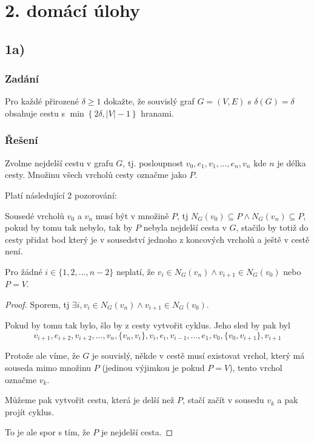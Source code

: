 \documentclass[../main.tex]{subfiles}
\begin{document}
\section{2. domácí úlohy}

\subsection{1a)}
\subsubsection*{Zadání}
Pro každé přirozené $\delta\geq1$ dokažte, že souvislý graf
$G=(V,E)$ s $\delta(G) = \delta$ obsahuje cestu s $\min\left\{2\delta, |V| - 1\right\}$
hranami.

\subsubsection*{Řešení}

Zvolme nejdelší cestu v grafu $G$, tj. posloupnost $v_0, e_1, v_1, ..., e_n, v_n$
kde $n$ je délka cesty. Množinu všech vrcholů cesty označme jako $P$.

Platí následující 2 pozorování:

Sousedé vrcholů $v_0$ a $v_n$ musí být v množině $P$, tj $N_G(v_0) \subseteq P \wedge N_G(v_n) \subseteq P$,
pokud by tomu tak nebylo, tak by $P$ nebyla nejdelší cesta v $G$, 
stačilo by totiž do cesty přidat bod který je v sousedství jednoho z koncových vrcholů a ještě v cestě není.

Pro žádné $i\in\{  1,2,...,n-2 \}$ neplatí, že $v_i \in N_G(v_n) \wedge v_{i+1} \in N_G(v_0)$ nebo $P = V$.
\begin{proof}
    Sporem, tj $\exists i, v_i \in N_G(v_n) \wedge v_{i+1} \in N_G(v_0)$.

    Pokud by tomu tak bylo, šlo by z cesty vytvořit cyklus. Jeho sled by pak byl  
    \begin{equation*}
        v_{i+1}, e_{i+2}, v_{i+2}, ..., v_n, \{v_n, v_i\}, v_i, e_i, v_{i-1}, ..., e_{1}, v_0, \{v_0, v_{i+1}\}, v_{i+1}
    \end{equation*}

    Protože ale víme, že $G$ je souvislý, někde v cestě musí existovat vrchol, 
    který má souseda mimo množinu $P$ (jedinou výjimkou je pokud $P = V$), tento vrchol označme $v_k$.
    
    Můžeme pak vytvořit cestu, která je delší než $P$, stačí začít v sousedu $v_k$ a pak projít cyklus.
    
    To je ale spor s tím, že $P$ je nejdelší cesta. 
\end{proof}
\end{document}
